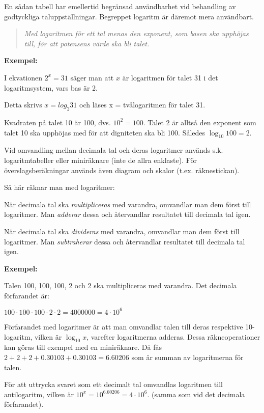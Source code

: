 En sådan tabell har emellertid begränsad användbarhet vid behandling av
godtyckliga taluppställningar. Begreppet logaritm är däremot mera användbart.

\begin{quote}\emph{
Med logaritmen för ett tal menas den exponent, som basen ska upphöjas till,
för att potensens värde ska bli talet.
}\end{quote}

\textbf{Exempel:}

I ekvationen \(2^x = 31\) säger man att \(x\) är logaritmen för talet 31 i det
logaritmsystem, vars bas är 2.

Detta skrivs \(x= log_2 31\) och läses x = tvålogaritmen för talet 31.

Kvadraten på talet 10 är 100, dvs. \(10^2 = 100\).
Talet 2 är alltså den exponent som talet 10 ska upphöjas med för att digniteten
ska bli 100.
Således \(\log_{10}{100} = 2\).

Vid omvandling mellan decimala tal och deras logaritmer används s.k.
logaritmtabeller eller miniräknare (inte de allra enklaste).
För överslagsberäkningar används även diagram och skalor (t.ex. räknestickan).

Så här räknar man med logaritmer:

När decimala tal ska \emph{multipliceras} med varandra, omvandlar man dem
först till logaritmer.
Man \emph{adderar} dessa och återvandlar resultatet till decimala tal igen.

När decimala tal ska \emph{divideras} med varandra, omvandlar man dem först
till logaritmer.
Man \emph{subtraherar} dessa och återvandlar resultatet till decimala tal igen.

\textbf{Exempel:}

Talen 100, 100, 100, 2 och 2 ska multipliceras med varandra.
Det decimala förfarandet är:

\(100 \cdot 100 \cdot 100 \cdot 2 \cdot 2 = 4000000 = 4 \cdot 10^6\)

Förfarandet med logaritmer är att man omvandlar talen till deras respektive
10-logaritm, vilken är \(\log_{10} x\), varefter logaritmerna adderas.
Dessa räkneoperationer kan göras till exempel med en miniräknare.
Då fås \(2 + 2 + 2 + 0.30103 + 0.30103 = 6.60206\) som är summan av
logaritmerna för talen.

För att uttrycka svaret som ett decimalt tal omvandlas logaritmen till
antilogaritm, vilken är \(10^x = 10^{6.60206} = 4 \cdot 10^6\).
(samma som vid det decimala förfarandet).

